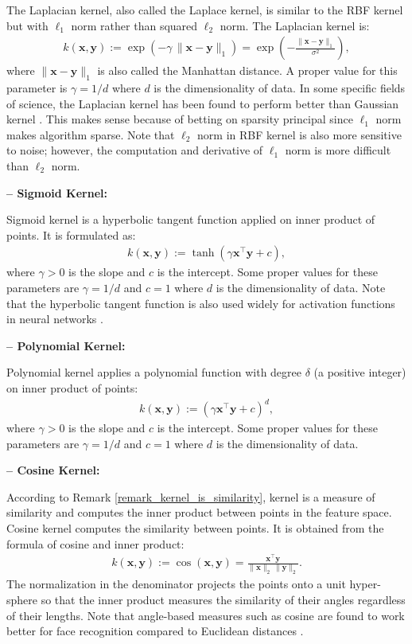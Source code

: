 \documentclass[lang=cn,10pt]{gorgeousnbook}
\numberwithin{equation}{section}%
\numberwithin{figure}{section}%
\begin{document}
The Laplacian kernel, also called the Laplace kernel, is similar to the RBF kernel but with $\ell_1$ norm rather than squared $\ell_2$ norm. The Laplacian kernel is: 
\begin{align}
k(\boldsymbol{x}, \boldsymbol{y}) := \exp(-\gamma\, \|\boldsymbol{x} - \boldsymbol{y}\|_1) = \exp(-\frac{\|\boldsymbol{x} - \boldsymbol{y}\|_1}{\sigma^2}),
\end{align}
where $\|\boldsymbol{x} - \boldsymbol{y}\|_1$ is also called the Manhattan distance. 
A proper value for this parameter is $\gamma=1/d$ where $d$ is the dimensionality of data.
In some specific fields of science, the Laplacian kernel has been found to perform better than Gaussian kernel \cite{rupp2015machine}. This makes sense because of betting on sparsity principal \cite{hastie2009elements} since $\ell_1$ norm makes algorithm sparse. 
Note that $\ell_2$ norm in RBF kernel is also more sensitive to noise; however, the computation and derivative of $\ell_1$ norm is more difficult than $\ell_2$ norm. 

\textbf{-- Sigmoid Kernel:}

Sigmoid kernel is a hyperbolic tangent function applied on inner product of points. It is formulated as:
\begin{align}
k(\boldsymbol{x}, \boldsymbol{y}) := \tanh(\gamma \boldsymbol{x}^\top \boldsymbol{y} + c),
\end{align}
where $\gamma >0$ is the slope and $c$ is the intercept. Some proper values for these parameters are $\gamma=1/d$ and $c=1$ where $d$ is the dimensionality of data.
Note that the hyperbolic tangent function is also used widely for activation functions in neural networks \cite{goodfellow2016deep}. 

\textbf{-- Polynomial Kernel:}

Polynomial kernel applies a polynomial function with degree $\delta$ (a positive integer) on inner product of points:
\begin{align}
k(\boldsymbol{x}, \boldsymbol{y}) := (\gamma \boldsymbol{x}^\top \boldsymbol{y} + c)^d,
\end{align}
where $\gamma >0$ is the slope and $c$ is the intercept. Some proper values for these parameters are $\gamma=1/d$ and $c=1$ where $d$ is the dimensionality of data.

\textbf{-- Cosine Kernel:}

According to Remark \ref{remark_kernel_is_similarity}, kernel is a measure of similarity and computes the inner product between points in the feature space. 
Cosine kernel computes the similarity between points. It is obtained from the formula of cosine and inner product:
\begin{align}\label{equation_cosine_kernel}
k(\boldsymbol{x}, \boldsymbol{y}) := \cos(\boldsymbol{x}, \boldsymbol{y}) = \frac{\boldsymbol{x}^\top \boldsymbol{y}}{\|\boldsymbol{x}\|_2\, \|\boldsymbol{y}\|_2}.
\end{align}
The normalization in the denominator projects the points onto a unit hyper-sphere so that the inner product measures the similarity of their angles regardless of their lengths. 
Note that angle-based measures such as cosine are found to work better for face recognition compared to Euclidean distances \cite{perlibakas2004distance}.
\end{document}
